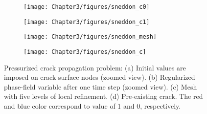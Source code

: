\begin{figure}[htbp!]
  \centering
  \begin{subfigure}[t]{0.46\linewidth}
    \centering
    \texttt{[image: Chapter3/figures/sneddon\_c0]}
    \caption{}
    \label{fig:sneddon_c0}
  \end{subfigure}
  \begin{subfigure}[t]{0.46\linewidth}
    \centering
    \texttt{[image: Chapter3/figures/sneddon\_c1]}
    \caption{}
    \label{fig:sneddon_c1}
  \end{subfigure}
  \begin{subfigure}[t]{0.475\linewidth}
    \centering
    \texttt{[image: Chapter3/figures/sneddon\_mesh]}
    \caption{}
    \label{fig:sneddon_mesh}
  \end{subfigure}
  \begin{subfigure}[t]{0.475\linewidth}\centering
    \texttt{[image: Chapter3/figures/sneddon\_c]}
    \caption{}
    \label{fig:sneddon_c}
  \end{subfigure}
  \caption[Sneddon benchmark problem.]{\label{fig:sneddon}Pressurized crack propagation problem: (a) Initial values are imposed on crack surface nodes (zoomed view). (b) Regularized phase-field variable after one time step (zoomed view). (c) Mesh with five levels of local refinement. (d) Pre-existing crack. The red and blue color correspond to value of 1 and 0, respectively.}
\end{figure}

